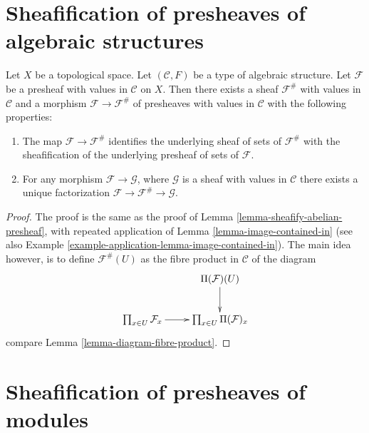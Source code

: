 \section{Sheafification of presheaves of algebraic structures}
\label{section-sheafification-presheaves-structures}


\begin{lemma}
\label{lemma-sheafify-presheaf-structures}
Let $X$ be a topological space.
Let $(\mathcal{C}, F)$ be a type of algebraic structure.
Let $\mathcal{F}$ be a presheaf with values in $\mathcal{C}$
on $X$. Then there exists a sheaf $\mathcal{F}^\#$ with values
in $\mathcal{C}$ and a morphism $\mathcal{F} \to \mathcal{F}^\#$
of presheaves with values in $\mathcal{C}$ with the
following properties:
\begin{enumerate}
\item The map $\mathcal{F} \to \mathcal{F}^\#$ identifies
the underlying sheaf of sets of $\mathcal{F}^\#$ with
the sheafification of the underlying presheaf of sets of $\mathcal{F}$.
\item For any morphism $\mathcal{F} \to \mathcal{G}$, where
$\mathcal{G}$ is a sheaf with values in $\mathcal{C}$ there exists
a unique factorization $\mathcal{F} \to \mathcal{F}^\# \to \mathcal{G}$.
\end{enumerate}
\end{lemma}

\begin{proof}
The proof is the same as the proof of
Lemma \ref{lemma-sheafify-abelian-presheaf},
with repeated application of
Lemma \ref{lemma-image-contained-in} (see also
Example \ref{example-application-lemma-image-contained-in}).
The main idea however, is to define $\mathcal{F}^\#(U)$
as the fibre product in $\mathcal{C}$ of the diagram
$$
\xymatrix{
 &
\Pi(\mathcal{F})(U) \ar[d] \\
\prod_{x \in U} \mathcal{F}_x
\ar[r] &
\prod_{x \in U} \Pi(\mathcal{F})_x
}
$$
compare Lemma \ref{lemma-diagram-fibre-product}.
\end{proof}

\section{Sheafification of presheaves of modules}
\label{section-sheafification-presheaves-modules}


